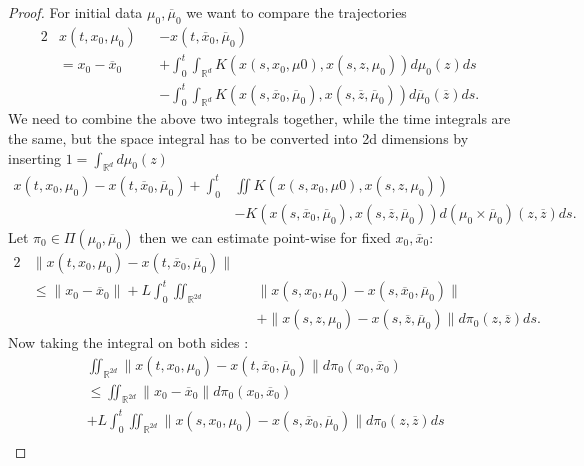\begin{proof}
  For initial data $\mu_{0} ,\overline{\mu}_0$ we want to compare the trajectories
  \begin{alignat*}{2}
   &x(t,x_{0},\mu_{0}) &&- x(t,\overline{x}_0,\overline{\mu }_0 ) \\
   &= x_{0}-\overline{x}_0 &&+ \int_0^{t} \int_{\mathbb{R}^{d } } K(x(s,x_{0},\mu 0),x(s,z,\mu_0))   d\mu_0(z) ds \\
   & &&- \int_0^{t} \int_{\mathbb{R}^{d} } K(x(s,\overline{x}_0,\overline{\mu }_0  ),x(s,\overline{z },\overline{\mu }_0  )) d\overline{\mu}_0(\overline{z} ) ds
 .\end{alignat*}
 We need to combine the above two integrals together, while the time integrals are the same, but the space integral has to be converted into 2d dimensions by inserting $1 = \int_{\mathbb{R}^{d} } d\mu_0(z)$
 \begin{align*}
   x(t,x_{0},\mu_{0}) - x(t,\overline{x}_0,\overline{\mu }_0 ) + \int_0^{t} &\iint   K(x(s,x_{0},\mu 0),x(s,z,\mu_0)) \\
   &- K(x(s,\overline{x}_0,\overline{\mu }_0  ),x(s,\overline{z },\overline{\mu }_0 ))  d(\mu_0 \times \overline{\mu }_0)(z,\overline{z} ) ds
 .\end{align*}
 Let $\pi_0 \in  \Pi(\mu_{0},\overline{\mu }_0 )$ then we can estimate point-wise for fixed $x_{0},\overline{x }_0 $:
 \begin{alignat*}{2}
   &\|x(t,x_{0},\mu_0) - x(t,\overline{x}_0,\overline{\mu }_0  )\| \\
   &\le  \|x_{0}-\overline{x}_0 \| + L\int_0^{t} \iint_{\mathbb{R}^{2d } }&& \|x(s,x_{0},\mu_0) - x(s,\overline{x }_0,\overline{\mu }_0  )\|\\
   & &&+ \|x(s,z,\mu_0) - x(s,\overline{z},\overline{\mu }_0  )\| d\pi_0(z,\overline{z} ) ds
 .\end{alignat*}
 Now taking the integral on both sides : 
 \begin{align*}
   &\iint_{\mathbb{R}^{2d } }  \|x(t,x_{0},\mu_0) - x(t,\overline{x}_0,\overline{\mu }_0  )\| d\pi_0(x_{0},\overline{x}_0 ) \\
   &\le \iint_{\mathbb{R}^{2d} } \|x_{0}-\overline{x}_0 \| d\pi_0(x_{0},\overline{x}_0 ) \\
                                                                                                                               &+ L\int_0^{t}  \iint_{\mathbb{R}^{2d } }  \|x(s,x_{0},\mu_0) - x(s,\overline{x }_0,\overline{\mu }_0  )\| d\pi_0(z,\overline{z} ) ds \\

\end{align*}
\end{proof}
